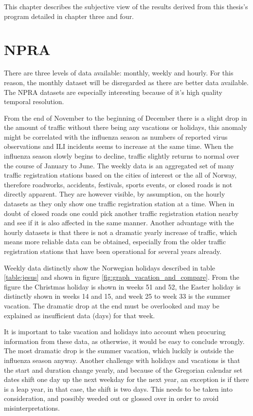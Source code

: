 This chapter describes the subjective view of the results derived from this thesis's program detailed in chapter three and four. %

\section{NPRA}
There are three levels of data available: monthly, weekly and hourly. For this reason, the monthly dataset will be disregarded as there are better data available. The NPRA datasets are especially interesting because of it's high quality temporal resolution.

From the end of November to the beginning of December there is a slight drop in the amount of traffic without there being any vacations or holidays, this anomaly might be correlated with the influenza season as numbers of reported virus observations and ILI incidents seems to increase at the same time. When the influenza season slowly begins to decline, traffic slightly returns to normal over the course of January to June. The weekly data is an aggregated set of many traffic registration stations based on the cities of interest or the all of Norway, therefore roadworks, accidents, festivals, sports events, or closed roads is not directly apparent. They are however visible, by assumption, on the hourly datasets as they only show one traffic registration station at a time. When in doubt of closed roads one could pick another traffic registration station nearby and see if it is also affected in the same manner. Another advantage with the hourly datasets is that there is not a dramatic yearly increase of traffic, which means more reliable data can be obtained, especially from the older traffic registration stations that have been operational for several years already.

Weekly data distinctly show the Norwegian holidays described in table \ref{table:jesus} and shown in figure \ref{fig:graph_vacation_and_compare}. From the figure the Christmas holiday is shown in weeks 51 and 52, the Easter holiday is distinctly shown in weeks 14 and 15, and week 25 to week 33 is the summer vacation. The dramatic drop at the end must be overlooked and may be explained as insufficient data (days) for that week. 

It is important to take vacation and holidays into account when procuring information from these data, as otherwise, it would be easy to conclude wrongly. The most dramatic drop is the summer vacation, which luckily is outside the influenza season anyway. 
Another challenge with holidays and vacations is that the start and duration change yearly, and because of the Gregorian calendar set dates shift one day up the next weekday for the next year, an exception is if there is a leap year, in that case, the shift is two days. This needs to be taken into consideration, and possibly weeded out or glossed over in order to avoid misinterpretations.

